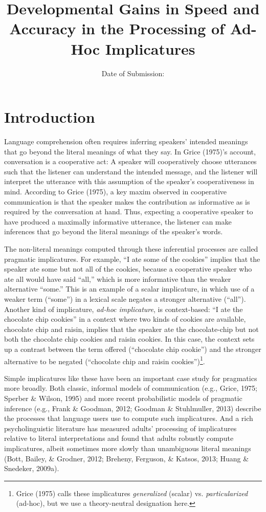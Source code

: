\documentclass[a4paper,man,apacite,floatsintext]{apa6}
\date{}
\title{\textbf{Developmental Gains in Speed and Accuracy in the Processing of Ad-Hoc
Implicatures}}
\author{Date of Submission:}
\affiliation{September 12, 2016}
\begin{document}
\maketitle

\section{Introduction}\label{introduction}

Language comprehension often requires inferring speakers' intended
meanings that go beyond the literal meanings of what they say. In Grice
(1975)'s account, conversation is a cooperative act: A speaker will
cooperatively choose utterances such that the listener can understand
the intended message, and the listener will interpret the utterance with
this assumption of the speaker's cooperativeness in mind. According to
Grice (1975), a key maxim observed in cooperative communication is that
the speaker makes the contribution as informative as is required by the
conversation at hand. Thus, expecting a cooperative speaker to have
produced a maximally informative utterance, the listener can make
inferences that go beyond the literal meanings of the speaker's words.

The non-literal meanings computed through these inferential processes
are called pragmatic implicatures. For example, ``I ate some of the
cookies'' implies that the speaker ate some but not all of the cookies,
because a cooperative speaker who ate all would have said ``all,'' which
is more informative than the weaker alternative ``some.'' This is an
example of a scalar implicature, in which use of a weaker term
(``some'') in a lexical scale negates a stronger alternative (``all'').
Another kind of implicature, \emph{ad-hoc implicature}, is
context-based: ``I ate the chocolate chip cookies'' in a context where
two kinds of cookies are available, chocolate chip and raisin, implies
that the speaker ate the chocolate-chip but not both the chocolate chip
cookies and raisin cookies. In this case, the context sets up a contrast
between the term offered (``chocolate chip cookie'') and the stronger
alternative to be negated (``chocolate chip and raisin
cookies'')\footnote{Grice (1975) calls these implicatures
  \emph{generalized} (scalar) vs. \emph{particularized} (ad-hoc), but we
  use a theory-neutral designation here.}.

Simple implicatures like these have been an important case study for
pragmatics more broadly. Both classic, informal models of communication
(e.g., Grice, 1975; Sperber \& Wilson, 1995) and more recent
probabilistic models of pragmatic inference (e.g., Frank \& Goodman,
2012; Goodman \& Stuhlmuller, 2013) describe the processes that language
users use to compute such implicatures. And a rich psycholinguistic
literature has measured adults' processing of implicatures relative to
literal interpretations and found that adults robustly compute
implicatures, albeit sometimes more slowly than unambiguous literal
meanings (Bott, Bailey, \& Grodner, 2012; Breheny, Ferguson, \& Katsos,
2013; Huang \& Snedeker, 2009a).
\end{document}
